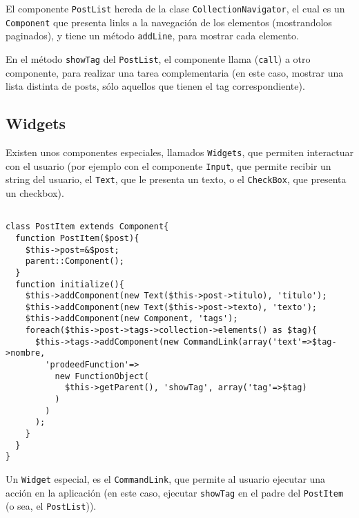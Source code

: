 El componente \verb"PostList" hereda de la clase \verb"CollectionNavigator", el cual es un \verb"Component" que presenta links a la navegación de los elementos (mostrandolos paginados), y tiene un método \verb"addLine", para mostrar cada elemento.

En el método \verb"showTag" del \verb"PostList", el componente llama (\verb"call") a otro componente, para realizar una tarea complementaria (en este caso, mostrar una lista distinta de posts, sólo aquellos que tienen el tag correspondiente).

\subsection{Widgets}
\label{sub-widget}

Existen unos componentes especiales, llamados \verb"Widgets", que permiten interactuar con el usuario (por ejemplo con el componente \verb"Input", que permite recibir un string del usuario, el \verb"Text", que le presenta un texto, o el \verb"CheckBox", que presenta un checkbox).

\begin{verbatim}

class PostItem extends Component{
  function PostItem($post){
    $this->post=&$post;
    parent::Component();
  }
  function initialize(){
    $this->addComponent(new Text($this->post->titulo), 'titulo');
    $this->addComponent(new Text($this->post->texto), 'texto');
    $this->addComponent(new Component, 'tags');
    foreach($this->post->tags->collection->elements() as $tag){
      $this->tags->addComponent(new CommandLink(array('text'=>$tag->nombre,
        'prodeedFunction'=>
          new FunctionObject(
            $this->getParent(), 'showTag', array('tag'=>$tag)
          )
        )
      );
    }
  }
}

\end{verbatim}

Un \verb"Widget" especial, es el \verb"CommandLink", que permite al usuario ejecutar una acción en la aplicación (en este caso, ejecutar \verb"showTag" en el padre del \verb"PostItem" (o sea, el \verb"PostList")).

